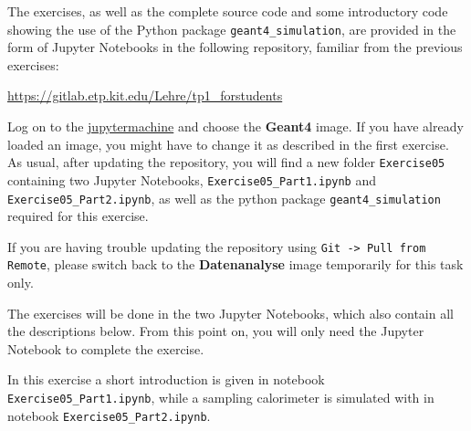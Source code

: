 \documentclass[a4paper,12pt]{article}
\begin{document}
The exercises, as well as the complete source code and some introductory code showing the use of the Python package \texttt{geant4\_simulation}, are provided in the form of Jupyter Notebooks in the following repository, familiar from the previous exercises: \par
{\centering \footnotesize
    \url{https://gitlab.etp.kit.edu/Lehre/tp1_forstudents}\par
}
Log on to the \href{https://jupytermachine.etp.kit.edu}{jupytermachine} and choose the \textbf{Geant4} image.
If you have already loaded an image, you might have to change it as described in the first exercise.
As usual, after updating the repository, you will find a new folder \texttt{Exercise05} containing two Jupyter Notebooks, \texttt{Exercise05\_Part1.ipynb} and \texttt{Exercise05\_Part2.ipynb}, as well as the python package \texttt{geant4\_simulation} required for this exercise.

If you are having trouble updating the repository using \texttt{Git -> Pull from Remote}, please switch back to the \textbf{Datenanalyse} image temporarily for this task only.

The exercises will be done in the two Jupyter Notebooks, which also contain all the descriptions below.
From this point on, you will only need the Jupyter Notebook to complete the exercise.

In this exercise a short introduction is given in notebook \texttt{Exercise05\_Part1.ipynb}, while a sampling calorimeter is simulated with \geantf in notebook \texttt{Exercise05\_Part2.ipynb}.


\newpage
\end{document}
